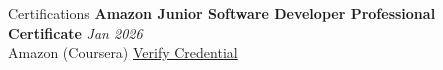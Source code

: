 \documentclass{resume}
\begin{document}
\begin{rSection}{Certifications}
\vspace{-0.3em}
\textbf{Amazon Junior Software Developer Professional Certificate} \hfill {\em Jan 2026} \\
Amazon (Coursera) \hfill \href{https://www.coursera.org/account/accomplishments/professional-cert/4AW9FQF6E10D}{Verify Credential}
\end{rSection}

\end{document}

